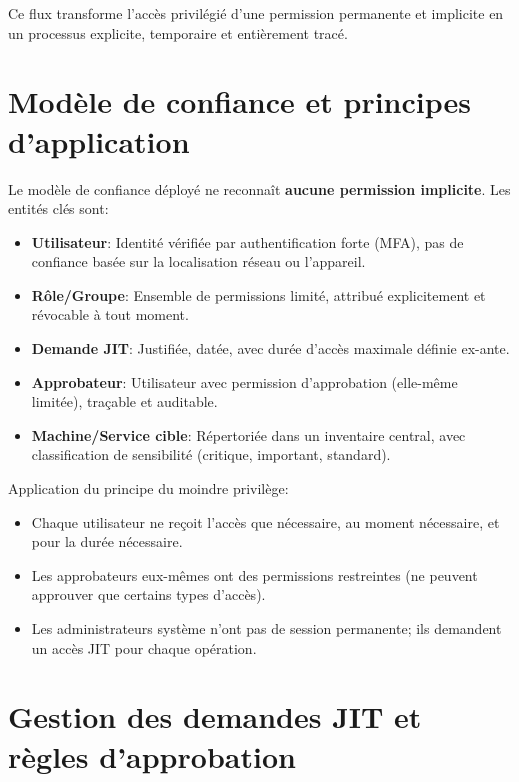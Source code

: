 Ce flux transforme l'accès privilégié d'une permission permanente et implicite en un processus explicite, temporaire et entièrement tracé.

\section{Modèle de confiance et principes d'application}

Le modèle de confiance déployé ne reconnaît \textbf{aucune permission implicite}. Les entités clés sont:

\begin{itemize}
	\item \textbf{Utilisateur}: Identité vérifiée par authentification forte (MFA), pas de confiance basée sur la localisation réseau ou l'appareil.
	
	\item \textbf{Rôle/Groupe}: Ensemble de permissions limité, attribué explicitement et révocable à tout moment.
	
	\item \textbf{Demande JIT}: Justifiée, datée, avec durée d'accès maximale définie ex-ante.
	
	\item \textbf{Approbateur}: Utilisateur avec permission d'approbation (elle-même limitée), traçable et auditable.
	
	\item \textbf{Machine/Service cible}: Répertoriée dans un inventaire central, avec classification de sensibilité (critique, important, standard).
\end{itemize}

Application du principe du moindre privilège:
\begin{itemize}
	\item Chaque utilisateur ne reçoit l'accès que nécessaire, au moment nécessaire, et pour la durée nécessaire.
	\item Les approbateurs eux-mêmes ont des permissions restreintes (ne peuvent approuver que certains types d'accès).
	\item Les administrateurs système n'ont pas de session permanente; ils demandent un accès JIT pour chaque opération.
\end{itemize}

\section{Gestion des demandes JIT et règles d'approbation}


